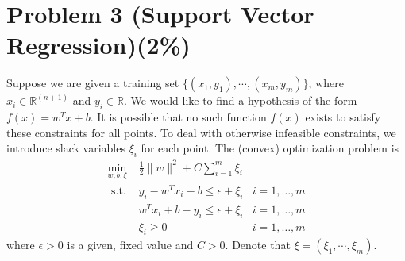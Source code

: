 \documentclass{article}
\newcommand{\real}{\mathbb{R}}
\def\real{{\mathbb {R}}}
\begin{document}
\section*{Problem 3 (Support Vector Regression)(2\%)}
Suppose we are given a training set $\{(x_1, y_1), \cdots, (x_m, y_m)\}$, where $x_i\in\real^{(n+1)}$ and $y_i\in\real$. We would like to find a hypothesis of the form $f(x)=w^T x+b$. It is possible that no such function $f(x)$ exists to satisfy these constraints for all points. To deal with otherwise infeasible constraints, we introduce slack variables $\xi_i$ for each point. The (convex) optimization problem is 
\begin{align}
\min _{w, b, \xi} & \frac{1}{2}\|w\|^2 + C\sum_{i=1}^m \xi_i & \\
\text { s.t. } & y_{i}-w^T x_{i}-b \leq \epsilon + \xi_i & i=1, \ldots, m \label{eq2}\\
& w^T x_{i}+b-y_{i} \leq \epsilon + \xi_i & i=1, \ldots, m\label{eq3} \\
& \xi_i \geq 0  & i=1, \ldots, m \label{eq4} 
\end{align}
where $\epsilon>0$ is a given, fixed value and $C>0$.  Denote that $\xi = (\xi_1, \cdots, \xi_m)$. 
\end{document}
